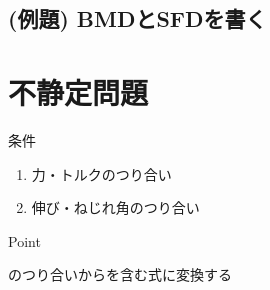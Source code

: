 \documentclass[a4paper]{jsarticle}
\begin{document}
\subsection{(例題) BMDとSFDを書く}

\section{不静定問題}
\begin{itembox}[l]{条件}
    \begin{enumerate}[(1)]
        \item 力・トルクのつり合い
        \item 伸び・ねじれ角のつり合い
    \end{enumerate}
\end{itembox}
\begin{itembox}[l]{Point}
    \begin{center}
        のつり合いからを含む式に変換する
    \end{center}
\end{itembox}
\end{document}
